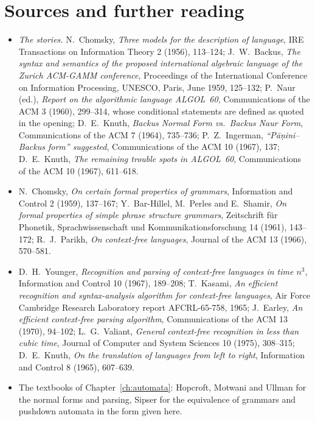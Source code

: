 \section*{Sources and further reading}

\begin{itemize}
\item \emph{The stories.} N.~Chomsky, \emph{Three models for the description of language}, IRE Transactions on Information Theory 2 (1956), 113--124; J.~W.~Backus, \emph{The syntax and semantics of the proposed international algebraic language of the Zurich ACM-GAMM conference}, Proceedings of the International Conference on Information Processing, UNESCO, Paris, June 1959, 125--132; P.~Naur (ed.), \emph{Report on the algorithmic language ALGOL~60}, Communications of the ACM 3 (1960), 299--314, whose conditional statements are defined as quoted in the opening; D.~E.~Knuth, \emph{Backus Normal Form vs.\ Backus Naur Form}, Communications of the ACM 7 (1964), 735--736; P.~Z.~Ingerman, \emph{``Pāṇini--Backus form'' suggested}, Communications of the ACM 10 (1967), 137; D.~E.~Knuth, \emph{The remaining trouble spots in ALGOL~60}, Communications of the ACM 10 (1967), 611--618.
\item N.~Chomsky, \emph{On certain formal properties of grammars}, Information and Control 2 (1959), 137--167; Y.~Bar-Hillel, M.~Perles and E.~Shamir, \emph{On formal properties of simple phrase structure grammars}, Zeitschrift für Phonetik, Sprachwissenschaft und Kommunikationsforschung 14 (1961), 143--172; R.~J.~Parikh, \emph{On context-free languages}, Journal of the ACM 13 (1966), 570--581.
\item D.~H.~Younger, \emph{Recognition and parsing of context-free languages in time $n^3$}, Information and Control 10 (1967), 189--208; T.~Kasami, \emph{An efficient recognition and syntax-analysis algorithm for context-free languages}, Air Force Cambridge Research Laboratory report AFCRL-65-758, 1965; J.~Earley, \emph{An efficient context-free parsing algorithm}, Communications of the ACM 13 (1970), 94--102; L.~G.~Valiant, \emph{General context-free recognition in less than cubic time}, Journal of Computer and System Sciences 10 (1975), 308--315; D.~E.~Knuth, \emph{On the translation of languages from left to right}, Information and Control 8 (1965), 607--639.
\item The textbooks of Chapter~\ref{ch:automata}: Hopcroft, Motwani and Ullman for the normal forms and parsing, Sipser for the equivalence of grammars and pushdown automata in the form given here.
\end{itemize}
